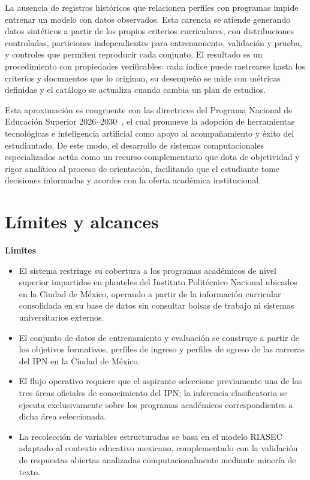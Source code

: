La ausencia de registros históricos que relacionen perfiles con programas impide entrenar un modelo con datos observados. Esta carencia se atiende generando datos sintéticos a partir de los propios criterios curriculares, con distribuciones controladas, particiones independientes para entrenamiento, validación y prueba, y controles que permiten reproducir cada conjunto. El resultado es un procedimiento con propiedades verificables: cada índice puede rastrearse hasta los criterios y documentos que lo originan, su desempeño se mide con métricas definidas y el catálogo se actualiza cuando cambia un plan de estudios.

Esta aproximación es congruente con las directrices del Programa Nacional de Educación Superior 2026--2030~\cite[p.~8]{SEP2026PRONES}, el cual promueve la adopción de herramientas tecnológicas e inteligencia artificial como apoyo al acompañamiento y éxito del estudiantado. De este modo, el desarrollo de sistemas computacionales especializados actúa como un recurso complementario que dota de objetividad y rigor analítico al proceso de orientación, facilitando que el estudiante tome decisiones informadas y acordes con la oferta académica institucional.

\section{Límites y alcances}

\textbf{Límites}

\begin{itemize}
    \item El sistema restringe su cobertura a los programas académicos de nivel superior impartidos en planteles del Instituto Politécnico Nacional ubicados en la Ciudad de México, operando a partir de la información curricular consolidada en su base de datos sin consultar bolsas de trabajo ni sistemas universitarios externos.
    \item El conjunto de datos de entrenamiento y evaluación se construye a partir de los objetivos formativos, perfiles de ingreso y perfiles de egreso de las carreras del IPN en la Ciudad de México.
    \item El flujo operativo requiere que el aspirante seleccione previamente una de las tres áreas oficiales de conocimiento del IPN; la inferencia clasificatoria se ejecuta exclusivamente sobre los programas académicos correspondientes a dicha área seleccionada.
    \item La recolección de variables estructuradas se basa en el modelo RIASEC adaptado al contexto educativo mexicano, complementado con la validación de respuestas abiertas analizadas computacionalmente mediante minería de texto.
\end{itemize}

